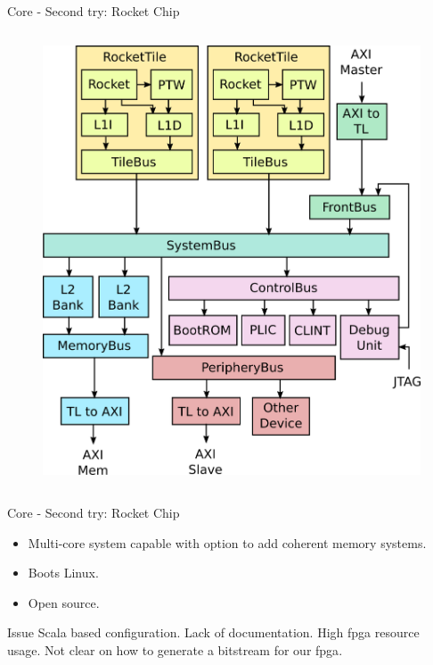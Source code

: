 \begin{frame}{Core - Second try: Rocket Chip}
\begin{columns}[T]
\begin{column}{.5\textwidth}
\begin{figure}[!ht]
    \includegraphics[width=1\linewidth]{images/rocketchip-diagram.png}
\end{figure}
\end{column}
\end{columns}
\end{frame}

\begin{frame}{Core - Second try: Rocket Chip}
  \begin{itemize}
    \item Multi-core system capable with option to add coherent memory systems.
    \item Boots Linux.
    \item Open source.
  \end{itemize}

  \begin{alertblock}{Issue}
    Scala based configuration. Lack of documentation. High \gls{fpga} resource usage. Not clear on how to generate a bitstream for our \gls{fpga}.
  \end{alertblock}
\end{frame}


